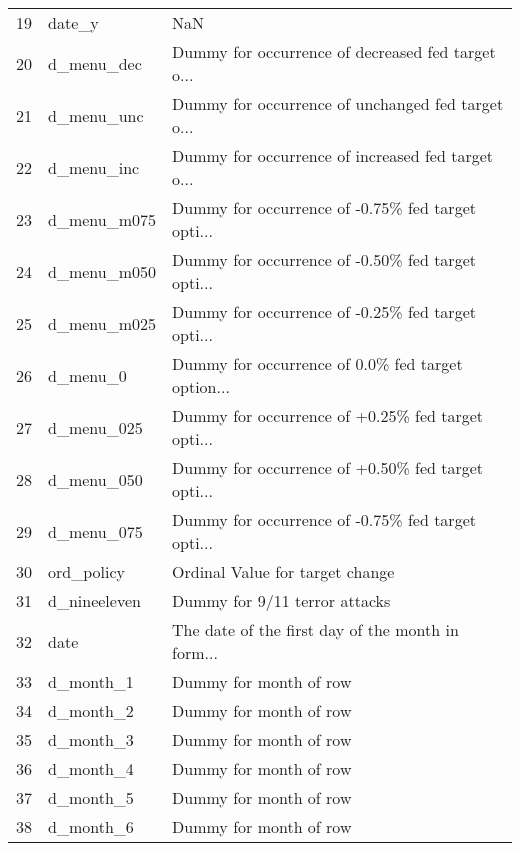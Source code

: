 \begin{tabular}{lll}
19  &                     date\_y &                                                NaN \\
20  &                 d\_menu\_dec &  Dummy for occurrence of decreased fed target o... \\
21  &                 d\_menu\_unc &  Dummy for occurrence of unchanged fed target o... \\
22  &                 d\_menu\_inc &  Dummy for occurrence of increased fed target o... \\
23  &                d\_menu\_m075 &  Dummy for occurrence of -0.75\% fed target opti... \\
24  &                d\_menu\_m050 &  Dummy for occurrence of -0.50\% fed target opti... \\
25  &                d\_menu\_m025 &  Dummy for occurrence of -0.25\% fed target opti... \\
26  &                   d\_menu\_0 &  Dummy for occurrence of 0.0\% fed target option... \\
27  &                 d\_menu\_025 &  Dummy for occurrence of +0.25\% fed target opti... \\
28  &                 d\_menu\_050 &  Dummy for occurrence of +0.50\% fed target opti... \\
29  &                 d\_menu\_075 &  Dummy for occurrence of -0.75\% fed target opti... \\
30  &                 ord\_policy &                    Ordinal Value for target change \\
31  &               d\_nineeleven &                      Dummy for 9/11 terror attacks \\
32  &                       date &  The date of the first day of the month in form... \\
33  &                  d\_month\_1 &                             Dummy for month of row \\
34  &                  d\_month\_2 &                             Dummy for month of row \\
35  &                  d\_month\_3 &                             Dummy for month of row \\
36  &                  d\_month\_4 &                             Dummy for month of row \\
37  &                  d\_month\_5 &                             Dummy for month of row \\
38  &                  d\_month\_6 &                             Dummy for month of row \\

\end{tabular}

